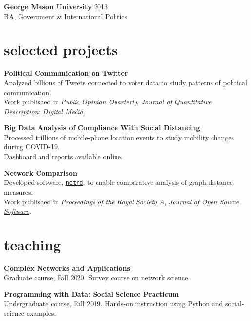 \documentclass[11pt, letter]{article}
\begin{document}
\textbf{George Mason University}  \hfill 2013 \\
BA, Government \& International Politics \\

\vspace{2mm}

\section{selected projects}

\textbf{Political Communication on Twitter} \\
Analyzed billions of Tweets connected to voter data to study patterns of political communication. \\
Work published in \href{https://academic.oup.com/poq/article/85/S1/323/6342443?guestAccessKey=3c4778c7-e064-4647-b223-6caa3ab9e002}{\emph{Public Opinion Quarterly}}, \href{https://journalqd.org/article/view/2570}{\emph{Journal of Quantitative Description: Digital Media}}.

\vspace{3mm}
\textbf{Big Data Analysis of Compliance With Social Distancing}\\
Processed trillions of mobile-phone location events to study mobility changes during COVID-19. \\
Dashboard and reports \href{https://covid19.gleamproject.org/mobility}{available online}.

\vspace{3mm}
\textbf{Network Comparison} \\
Developed software, \href{https://github.com/netsiphd/netrd}{\texttt{netrd}}, to enable comparative analysis of graph distance measures. \\
Work published in \href{https://royalsocietypublishing.org/doi/10.1098/rspa.2019.0744}{\emph{Proceedings of the Royal Society A}}, \href{https://joss.theoj.org/papers/10.21105/joss.02990}{\emph{Journal of Open Source Software}}.

\section{teaching}
\textbf{Complex Networks and Applications} \\
Graduate course, \href{https://web.archive.org/web/20210102223738/barabasilab.com/course}{Fall 2020}. Survey course on network science.
\vspace{3mm}

\textbf{Programming with Data: Social Science Practicum} \\
Undergraduate course, \href{https://sdmccabe.github.io/ds2001/}{Fall 2019}. Hands-on instruction using Python and social-science examples.
\end{document}
